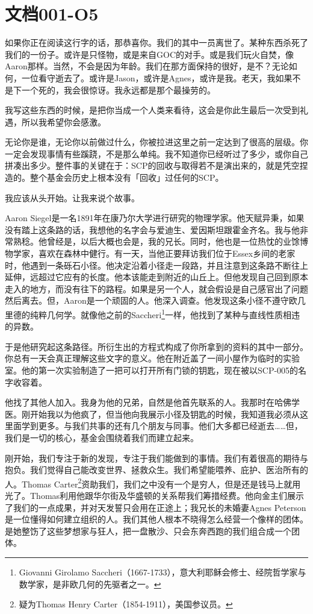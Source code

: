 \section{文档001-O5}

\label{sec:DOC-001-05}

如果你正在阅读这行字的话，那恭喜你。我们的其中一员离世了。某种东西杀死了我们的一份子。或许是只怪物，或是来自GOC的对手。或是我们玩火自焚，像Aaron那样。当然，不会是因为年龄。我们在那方面保持的很好，是不？无论如何，一位看守逝去了。或许是Jason，或许是Agnes，或许是我。老天，我如果不是下一个死的，我会很惊讶。我永远都是那个最操劳的。

我写这些东西的时候，是把你当成一个人类来看待，这会是你此生最后一次受到礼遇，所以我希望你会感激。

无论你是谁，无论你以前做过什么，你被拉进这里之前一定达到了很高的层级。你一定会发现事情有些蹊跷，不是那么单纯。我不知道你已经听过了多少，或你自己拼凑出多少。整件事的关键在于：SCP的回收与取得若不是演出来的，就是凭空捏造的。整个基金会历史上根本没有「回收」过任何的SCP。

我应该从头开始。让我来说个故事。

Aaron Siegel是一名1891年在康乃尔大学进行研究的物理学家。他天赋异秉，如果没有踏上这条路的话，我想他的名字会与爱迪生、爱因斯坦跟霍金齐名。我与他非常熟稔。他曾经是，以后大概也会是，我的兄长。同时，他也是一位热忱的业馀博物学家，喜欢在森林中健行。有一天，当他正要拜访我们位于Essex乡间的老家时，他遇到一条砾石小径。他决定沿着小径走一段路，并且注意到这条路不断往上延伸，远超过它应有的长度。他本该能走到附近的山丘上。但他发现自己回到原本走入的地方，而没有往下的路程。如果是另一个人，就会假设是自己感官出了问题然后离去。但，Aaron是一个顽固的人。他深入调查。他发现这条小径不遵守欧几里德的纯粹几何学。就像他之前的Saccheri\footnote{Giovanni Girolamo Saccheri（1667-1733），意大利耶稣会修士、经院哲学家与数学家，是非欧几何的先驱者之一。}一样，他找到了某种与直线性质相违的异数。

于是他研究起这条路径。所衍生出的方程式构成了你所拿到的资料的其中一部分。你总有一天会真正理解这些文字的意义。他在附近盖了一间小屋作为临时的实验室。他的第一次实验制造了一把可以打开所有门锁的钥匙，现在被以SCP-005的名字收容着。

他找了其他人加入。我身为他的兄弟，自然是他首先联系的人。我那时在哈佛学医。刚开始我以为他疯了，但当他向我展示小径及钥匙的时候，我知道我必须从这里面学到更多。与我们共事的还有几个朋友与同事。他们大多都已经逝去……但，我们是一切的核心，基金会围绕着我们而建立起来。

刚开始，我们专注于新的发现，专注于我们能做到的事情。我们有着很高的期待与抱负。我们觉得自己能改变世界、拯救众生。我们希望能喂养、庇护、医治所有的人。Thomas Carter\footnote{疑为Thomas Henry Carter（1854-1911），美国参议员。}资助我们，我们之中没有一个是穷人，但是还是钱马上就用光了。Thomas利用他跟华尔街及华盛顿的关系帮我们筹措经费。他向金主们展示了我们的一点成果，并对天发誓只会用在正途上；我兄长的未婚妻Agnes Peterson是一位懂得如何建立组织的人。我们其他人根本不晓得怎么经营一个像样的团体。是她整饬了这些梦想家与狂人，把一盘散沙、只会东奔西跑的我们组合成一个团体。

